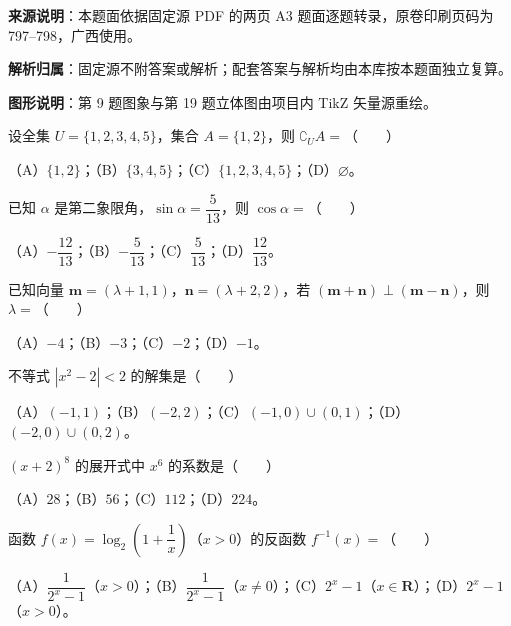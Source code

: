 

\begin{gknotice}
\textbf{来源说明}：本题面依据固定源 PDF 的两页 A3 题面逐题转录，原卷印刷页码为 797–798，广西使用。

\textbf{解析归属}：固定源不附答案或解析；配套答案与解析均由本库按本题面独立复算。

\textbf{图形说明}：第 9 题图象与第 19 题立体图由项目内 TikZ 矢量源重绘。
\end{gknotice}


\begin{question}
设全集 $U=\{1,2,3,4,5\}$，集合 $A=\{1,2\}$，则 $\complement_U A=$\mbox{（　　）}

（A）$\{1,2\}$；（B）$\{3,4,5\}$；（C）$\{1,2,3,4,5\}$；（D）$\varnothing$。

\end{question}
\begin{question}
已知 $\alpha$ 是第二象限角，$\sin\alpha=\dfrac5{13}$，则 $\cos\alpha=$\mbox{（　　）}

（A）$-\dfrac{12}{13}$；（B）$-\dfrac5{13}$；（C）$\dfrac5{13}$；（D）$\dfrac{12}{13}$。

\end{question}
\begin{question}
已知向量 $\boldsymbol m=(\lambda+1,1)$，$\boldsymbol n=(\lambda+2,2)$，若 $(\boldsymbol m+\boldsymbol n)\perp(\boldsymbol m-\boldsymbol n)$，则 $\lambda=$\mbox{（　　）}

（A）$-4$；（B）$-3$；（C）$-2$；（D）$-1$。

\end{question}
\begin{question}
不等式 $|x^2-2|<2$ 的解集是\mbox{（　　）}

（A）$(-1,1)$；（B）$(-2,2)$；（C）$(-1,0)\cup(0,1)$；（D）$(-2,0)\cup(0,2)$。

\end{question}
\begin{question}
$(x+2)^8$ 的展开式中 $x^6$ 的系数是\mbox{（　　）}

（A）$28$；（B）$56$；（C）$112$；（D）$224$。

\end{question}
\begin{question}
函数 $f(x)=\log_2\left(1+\dfrac1x\right)$（$x>0$）的反函数 $f^{-1}(x)=$\mbox{（　　）}

（A）$\dfrac1{2^x-1}$（$x>0$）；（B）$\dfrac1{2^x-1}$（$x\neq0$）；（C）$2^x-1$（$x\in\mathbf R$）；（D）$2^x-1$（$x>0$）。

\end{question}
